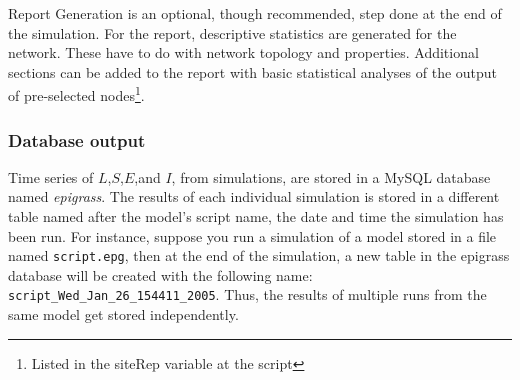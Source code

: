 Report Generation is an optional, though recommended, step done at the end of the simulation. For the report, descriptive statistics are generated for the network. These have to do with network topology and properties. Additional sections can be added to the report with basic statistical analyses of the output of pre-selected nodes\footnote{Listed in the siteRep variable at the script}.

\subsubsection{Database output}
Time series of $L$,$S$,$E$,and $I$, from simulations, are stored in a MySQL database named \emph{epigrass}. The results of each individual simulation is stored in a different table named after the model's script name, the date and time the simulation has been run. For instance, suppose you run a simulation of a model stored in a file named \texttt{script.epg}, then at the end of the simulation, a new table in the epigrass database will be created with the following name: \texttt{script\_Wed\_Jan\_26\_154411\_2005}. Thus, the results of multiple runs from the same model get stored independently.

